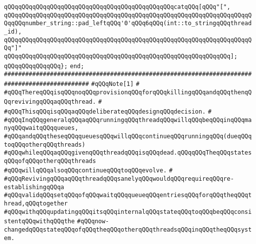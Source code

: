 \verb|qQQqqQQqqQQqqQQqqQQqqQQqqQQqqQQqqQQqqQQqqQQqqQQqcatqQQq[qQQq"[",|\newline
\verb|qQQqqQQqqQQqqQQqqQQqqQQqqQQqqQQqqQQqqQQqqQQqqQQqqQQqqQQqqQQqqQQqqQQqqQQqqQQqnumber_string::pad_leftqQQq'0'qQQq6qQQq(int::to_stringqQQqthread_id),|\newline
\verb|qQQqqQQqqQQqqQQqqQQqqQQqqQQqqQQqqQQqqQQqqQQqqQQqqQQqqQQqqQQqqQQqqQQqqQQq"]"|\newline
\verb|qQQqqQQqqQQqqQQqqQQqqQQqqQQqqQQqqQQqqQQqqQQqqQQqqQQqqQQqqQQqqQQq];|\newline
\newline
\verb|qQQqqQQqqQQqqQQq};|\newline
\verb|end;|\newline
\newline
\verb|##############################################################################################|\newline
\verb|#qQQqNote[1]|\newline
\verb|#|\newline
\verb|#qQQqThereqQQqisqQQqnoqQQqprovisionqQQqforqQQqkillingqQQqandqQQqthenqQQqrevivingqQQqaqQQqthread.|\newline
\verb|#|\newline
\verb|#qQQqThisqQQqisqQQqaqQQqdeliberateqQQqdesignqQQqdecision.|\newline
\verb|#|\newline
\verb|#qQQqInqQQqgeneralqQQqaqQQqrunningqQQqthreadqQQqwillqQQqbeqQQqinqQQqmanyqQQqwaitqQQqqueues,|\newline
\verb|#qQQqandqQQqtheseqQQqqueuesqQQqwillqQQqcontinueqQQqrunningqQQq(dueqQQqtoqQQqotherqQQqthreads)|\newline
\verb|#qQQqwhileqQQqaqQQqgivenqQQqthreadqQQqisqQQqdead.qQQqqQQqTheqQQqstatesqQQqofqQQqotherqQQqthreads|\newline
\verb|#qQQqwillqQQqalsoqQQqcontinueqQQqtoqQQqevolve.|\newline
\verb|#|\newline
\verb|#qQQqRevivingqQQqaqQQqthreadqQQqsanelyqQQqwouldqQQqrequireqQQqre-establishingqQQqa|\newline
\verb|#qQQqvalidqQQqsetqQQqofqQQqwaitqQQqqueueqQQqentriesqQQqforqQQqtheqQQqthread,qQQqtogether|\newline
\verb|#qQQqwithqQQqupdatingqQQqitsqQQqinternalqQQqstateqQQqtoqQQqbeqQQqconsistentqQQqwithqQQqthe|\newline
\verb|#qQQqnow-changedqQQqstateqQQqofqQQqtheqQQqotherqQQqthreadsqQQqinqQQqtheqQQqsystem.|\newline
